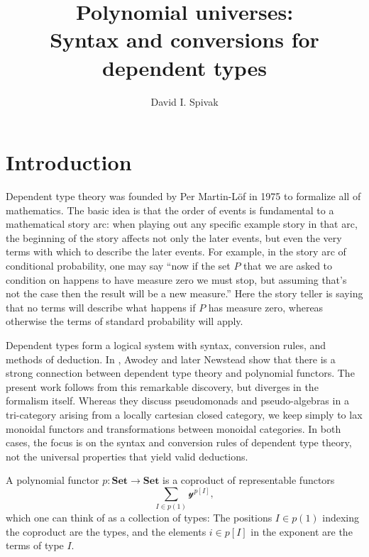 \documentclass[11pt, one side, article]{memoir}
\theoremstyle{definition}
\theoremstyle{plain}
\newcommand{\Cat}[1]{\mathbf{#1}}%
\newcommand{\smset}{\Cat{Set}}
\newcommand{\yon}{\mathcal{y}}
\newcommand{\0}{\textsf{0}}
\newcommand{\1}{\tn{\textsf{1}}}
\begin{document}
\title{Polynomial universes:\\Syntax and conversions for dependent types}

\author{David I. Spivak}

\date{\vspace{-.2in}}

\maketitle

\begin{abstract}
\end{abstract}


\chapter{Introduction}



Dependent type theory \cite{martin-lof1975intuitionistic} was founded by Per Martin-L\"{o}f in 1975 to formalize all of mathematics. The basic idea is that the order of events is fundamental to a mathematical story arc: when playing out any specific example story in that arc, the beginning of the story affects not only the later events, but even the very terms with which to describe the later events. For example, in the story arc of conditional probability, one may say ``now if the set $P$ that we are asked to condition on happens to have measure zero we must stop, but assuming that's not the case then the result will be a new measure.'' Here the story teller is saying that no terms will describe what happens if $P$ has measure zero, whereas otherwise the terms of standard probability will apply.

Dependent types form a logical system with syntax, conversion rules, and methods of deduction. In \cite{awodey2014natural,awodey2018polynomial}, Awodey and later Newstead show that there is a strong connection between dependent type theory and polynomial functors. The present work follows from this remarkable discovery, but diverges in the formalism itself. Whereas they discuss pseudomonads and pseudo-algebras in a tri-category arising from a locally cartesian closed category, we keep simply to lax monoidal functors and transformations between monoidal categories. In both cases, the focus is on the syntax and conversion rules of dependent type theory, not the universal properties that yield valid deductions.

A polynomial functor $p\colon\smset\to\smset$ is a coproduct of representable functors
\[\sum_{I\in p(1)}\yon^{p[I]},\]
which one can think of as a collection of types: The positions $I\in p(1)$ indexing the coproduct are the types, and the elements $i\in p[I]$ in the exponent are the terms of type $I$. 
\end{document}
